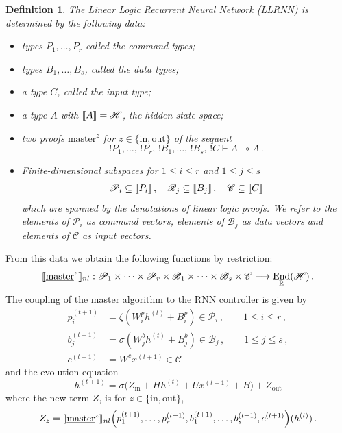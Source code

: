 \documentclass[english,letter paper,12pt,leqno]{article}
\theoremstyle{example}
\newtheorem{definition}[theorem]{Definition}
\numberwithin{equation}{section}
\def\be{\begin{equation}}
\def\ee{\end{equation}}
\DeclareMathOperator{\End}{End}
\begin{document}
\begin{definition} The Linear Logic Recurrent Neural Network (LLRNN) is determined by the following data:
\begin{itemize}
\item types $P_1,\ldots,P_r$ called the \emph{command types};
\item types $B_1,\ldots,B_s$, called the \emph{data types};
\item a type $C$, called the \emph{input type};
\item a type $A$ with $\llbracket A \rrbracket = \mathscr{H}$, the hidden state space;
\item two proofs $\underline{\mathrm{master}}^z$ for $z \in \{\mathrm{in},\mathrm{out}\}$ of the sequent
\be
{!} P_1, \ldots, \, {!}P_r,\, {!} B_1, \ldots,\, {!} B_s,\, {!} C \vdash A \multimap A\,.
\ee
\item Finite-dimensional subspaces for $1 \le i \le r$ and $1 \le j \le s$
\be
\mathscr{P}_i \subseteq \den{P_i}\,, \quad \mathscr{B}_j \subseteq \den{B_j}\,, \quad \mathscr{C} \subseteq \den{C}
\ee
which are spanned by the denotations of linear logic proofs. We refer to the elements of $\mathscr{P}_i$ as \emph{command vectors}, elements of $\mathscr{B}_j$ as \emph{data vectors} and elements of $\mathscr{C}$ as \emph{input vectors}.
\end{itemize}
\end{definition}
From this data we obtain the following functions by restriction:
\be
\den{\underline{\mathrm{master}}^z}_{nl}: \mathscr{P}_1 \times \cdots \times \mathscr{P}_r \times \mathscr{B}_1 \times \cdots \times \mathscr{B}_s \times \mathscr{C} \lto \End_{\mathbb{R}}(\mathscr{H})\,.
\ee
The coupling of the master algorithm to the RNN controller is given by
\begin{align*}
p_i^{(t+1)} &= \zeta( W^p_i h^{(t)} + B^p_i ) \in \mathscr{P}_i\,, \qquad 1 \le i \le r\,,\\
b_j^{(t+1)} &= \sigma( W^b_j h^{(t)} + B^b_j ) \in \mathscr{B}_j\,, \qquad 1 \le j \le s\,,\\
c^{(t+1)} &=  W^c x^{(t+1)} \in \mathscr{C}
\end{align*}
and the evolution equation
\be\label{eq:masterh}
h^{(t+1)} = \sigma\Big( Z_{\mathrm{in}} + H h^{(t)} + U x^{(t+1)} + B\Big) + Z_{\mathrm{out}}
\ee
where the new term $Z$, is for $z \in \{\mathrm{in},\mathrm{out}\}$,
\be\label{eq:masterz}
Z_z = \den{\underline{\mathrm{master}}^z}_{nl}\Big( p_1^{(t+1)}, \ldots, p_r^{(t+1)}, b_1^{(t+1)}, \ldots, b_s^{(t+1)}, c^{(t+1)}\Big)(h^{(t)})\,.
\ee
\end{document}
